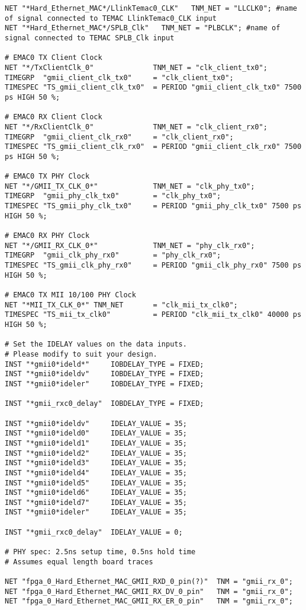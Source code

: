 \begin{verbatim}
NET "*Hard_Ethernet_MAC*/LlinkTemac0_CLK"   TNM_NET = "LLCLK0"; #name of signal connected to TEMAC LlinkTemac0_CLK input
NET "*Hard_Ethernet_MAC*/SPLB_Clk"   TNM_NET = "PLBCLK"; #name of signal connected to TEMAC SPLB_Clk input

# EMAC0 TX Client Clock
NET "*/TxClientClk_0"              TNM_NET = "clk_client_tx0";
TIMEGRP  "gmii_client_clk_tx0"     = "clk_client_tx0";
TIMESPEC "TS_gmii_client_clk_tx0"  = PERIOD "gmii_client_clk_tx0" 7500 ps HIGH 50 %;

# EMAC0 RX Client Clock
NET "*/RxClientClk_0"              TNM_NET = "clk_client_rx0";
TIMEGRP  "gmii_client_clk_rx0"     = "clk_client_rx0";
TIMESPEC "TS_gmii_client_clk_rx0"  = PERIOD "gmii_client_clk_rx0" 7500 ps HIGH 50 %;

# EMAC0 TX PHY Clock
NET "*/GMII_TX_CLK_0*"             TNM_NET = "clk_phy_tx0";
TIMEGRP  "gmii_phy_clk_tx0"        = "clk_phy_tx0";
TIMESPEC "TS_gmii_phy_clk_tx0"     = PERIOD "gmii_phy_clk_tx0" 7500 ps HIGH 50 %;

# EMAC0 RX PHY Clock
NET "*/GMII_RX_CLK_0*"             TNM_NET = "phy_clk_rx0";
TIMEGRP  "gmii_clk_phy_rx0"        = "phy_clk_rx0";
TIMESPEC "TS_gmii_clk_phy_rx0"     = PERIOD "gmii_clk_phy_rx0" 7500 ps HIGH 50 %;

# EMAC0 TX MII 10/100 PHY Clock
NET "*MII_TX_CLK_0*" TNM_NET       = "clk_mii_tx_clk0";
TIMESPEC "TS_mii_tx_clk0"          = PERIOD "clk_mii_tx_clk0" 40000 ps HIGH 50 %;

# Set the IDELAY values on the data inputs.
# Please modify to suit your design.
INST "*gmii0*ideld*"     IOBDELAY_TYPE = FIXED;
INST "*gmii0*ideldv"     IOBDELAY_TYPE = FIXED;
INST "*gmii0*ideler"     IOBDELAY_TYPE = FIXED;

INST "*gmii_rxc0_delay"  IOBDELAY_TYPE = FIXED;

INST "*gmii0*ideldv"     IDELAY_VALUE = 35;
INST "*gmii0*ideld0"     IDELAY_VALUE = 35;
INST "*gmii0*ideld1"     IDELAY_VALUE = 35;
INST "*gmii0*ideld2"     IDELAY_VALUE = 35;
INST "*gmii0*ideld3"     IDELAY_VALUE = 35;
INST "*gmii0*ideld4"     IDELAY_VALUE = 35;
INST "*gmii0*ideld5"     IDELAY_VALUE = 35;
INST "*gmii0*ideld6"     IDELAY_VALUE = 35;
INST "*gmii0*ideld7"     IDELAY_VALUE = 35;
INST "*gmii0*ideler"     IDELAY_VALUE = 35;

INST "*gmii_rxc0_delay"  IDELAY_VALUE = 0;

# PHY spec: 2.5ns setup time, 0.5ns hold time
# Assumes equal length board traces

NET "fpga_0_Hard_Ethernet_MAC_GMII_RXD_0_pin(?)"  TNM = "gmii_rx_0";
NET "fpga_0_Hard_Ethernet_MAC_GMII_RX_DV_0_pin"   TNM = "gmii_rx_0";
NET "fpga_0_Hard_Ethernet_MAC_GMII_RX_ER_0_pin"   TNM = "gmii_rx_0";


\end{verbatim}
